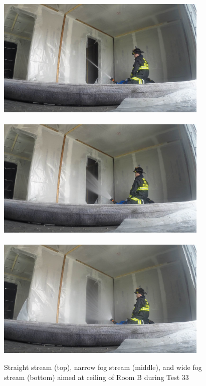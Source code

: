\documentclass[12pt,oneside]{book}
\begin{document}
\begin{figure}[!ht]
\includegraphics[trim=16cm 6.25cm 9cm 6cm, clip=true, width=4in]{../Pictures/SS_Room_B_Test_33}
\\~\\
\includegraphics[trim=16cm 6.25cm 9cm 6cm, clip=true, width=4in]{../Pictures/NF_Room_B_Test_33}
\\~\\
\includegraphics[trim=16cm 6.25cm 9cm 6cm, clip=true, width=4in]{../Pictures/WF_Room_B_Test_33}
\caption[Straight Stream, Narrow Fog Stream, and Wide Fog Stream during Test 33]{Straight stream (top), narrow fog stream (middle), and wide fog stream (bottom) aimed at ceiling of Room B during Test 33}
\label{fig:test_33_pic}
\end{figure}
\FloatBarrier
\end{document}
